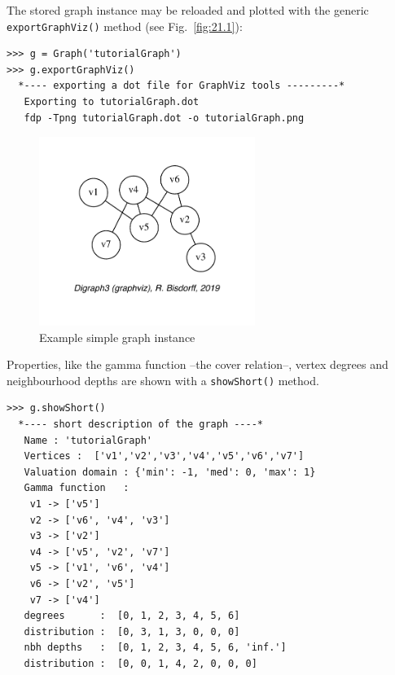 The stored graph instance may be reloaded and plotted with the generic \texttt{export\-GraphViz()} method (see Fig.~\vref{fig:21.1}):
\begin{lstlisting}
>>> g = Graph('tutorialGraph')
>>> g.exportGraphViz()
  *---- exporting a dot file for GraphViz tools ---------*
   Exporting to tutorialGraph.dot
   fdp -Tpng tutorialGraph.dot -o tutorialGraph.png
\end{lstlisting}
\begin{figure}[h]
\sidecaption[t]
\includegraphics[width=7cm]{Figures/21-1-tutorialGraph.pdf}
\caption{Example simple graph instance} 
\label{fig:21.1}       %
\end{figure}

Properties, like the gamma function --the cover relation--, vertex degrees and neighbourhood depths are shown with a \texttt{showShort()} method. 
\begin{lstlisting}[caption={Inspecting a graph instance},label=list:21.3]
>>> g.showShort()
  *---- short description of the graph ----*
   Name : 'tutorialGraph'
   Vertices :  ['v1','v2','v3','v4','v5','v6','v7']
   Valuation domain : {'min': -1, 'med': 0, 'max': 1}
   Gamma function   : 
    v1 -> ['v5']
    v2 -> ['v6', 'v4', 'v3']
    v3 -> ['v2']
    v4 -> ['v5', 'v2', 'v7']
    v5 -> ['v1', 'v6', 'v4']
    v6 -> ['v2', 'v5']
    v7 -> ['v4']
   degrees      :  [0, 1, 2, 3, 4, 5, 6]
   distribution :  [0, 3, 1, 3, 0, 0, 0]
   nbh depths   :  [0, 1, 2, 3, 4, 5, 6, 'inf.']
   distribution :  [0, 0, 1, 4, 2, 0, 0, 0]
\end{lstlisting}

